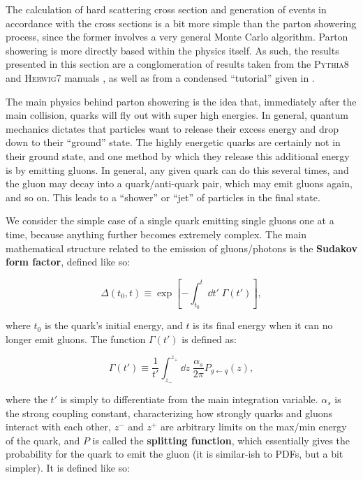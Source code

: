 The calculation of hard scattering cross section and generation of events in accordance with the cross sections is a bit more simple than the parton showering process, since the former involves a very general Monte Carlo algorithm. Parton showering is more directly based within the physics itself. As such, the results presented in this section are a conglomeration of results taken from the \textsc{Pythia8} and \textsc{Herwig7} manuals \cite{PYTHIA8DOC,HERWIGDOCS}, as well as from a condensed ``tutorial'' given in \cite{PYRESIAS}.

The main physics behind parton showering is the idea that, immediately after the main collision, quarks will fly out with super high energies. In general, quantum mechanics dictates that particles want to release their excess energy and drop down to their ``ground'' state. The highly energetic quarks are certainly not in their ground state, and one method by which they release this additional energy is by emitting gluons. In general, any given quark can do this several times, and the gluon may decay into a quark/anti-quark pair, which may emit gluons again, and so on. This leads to a ``shower'' or ``jet'' of particles in the final state.

We consider the simple case of a single quark emitting single gluons one at a time, because anything further becomes extremely complex. The main mathematical structure related to the emission of gluons/photons is the \textbf{Sudakov form factor}, defined like so:

\begin{equation}
  \Delta(t_0,t) \equiv \exp\left[ -\int_{t_0}^t \dd t' \; \Gamma(t') \right],
\end{equation}

where $t_0$ is the quark's initial energy, and $t$ is its final energy when it can no longer emit gluons. The function $\Gamma(t')$ is defined as:

\begin{equation}
  \Gamma(t') \equiv \frac{1}{t'} \int_{z_-}^{z_+} \dd z \; \frac{\alpha_s}{2\pi}P_{g \leftarrow q}(z),\label{eq:2-theory-gamma}
\end{equation}

where the $t'$ is simply to differentiate from the main integration variable. $\alpha_s$ is the strong coupling constant, characterizing how strongly quarks and gluons interact with each other, $z^-$ and $z^+$ are arbitrary limits on the max/min energy of the quark, and $P$ is called the \textbf{splitting function}, which essentially gives the probability for the quark to emit the gluon (it is similar-ish to PDFs, but a bit simpler). It is defined like so:

